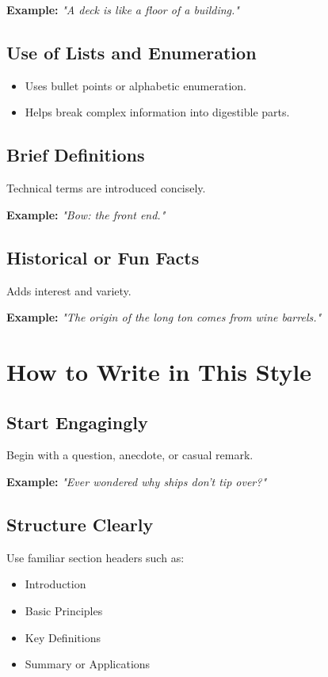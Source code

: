 \documentclass[12pt]{article}
\begin{document}
\textbf{Example:} \textit{"A deck is like a floor of a building."}

\subsection{Use of Lists and Enumeration}
\begin{itemize}
  \item Uses bullet points or alphabetic enumeration.
  \item Helps break complex information into digestible parts.
\end{itemize}

\subsection{Brief Definitions}
Technical terms are introduced concisely.

\textbf{Example:} \textit{"Bow: the front end."}

\subsection{Historical or Fun Facts}
Adds interest and variety.

\textbf{Example:} \textit{"The origin of the long ton comes from wine barrels."}

\section{ How to Write in This Style}

\subsection{Start Engagingly}
Begin with a question, anecdote, or casual remark.

\textbf{Example:} \textit{"Ever wondered why ships don’t tip over?"}

\subsection{Structure Clearly}
Use familiar section headers such as:
\begin{itemize}
  \item Introduction
  \item Basic Principles
  \item Key Definitions
  \item Summary or Applications
\end{itemize}
\end{document}
